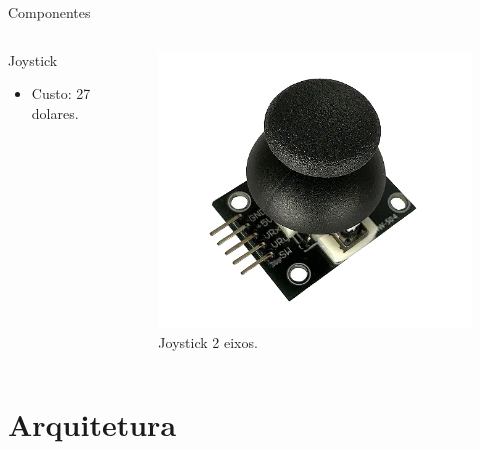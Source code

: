 \documentclass{if-beamer}
\begin{document}
\begin{frame}{Componentes}
	
	\begin{columns}
		
		\begin{column}{0.6\textwidth}
			
			\begin{block}{Joystick}
				
				\begin{itemize}
					\item Custo: 27 dolares.
				\end{itemize}
				
			\end{block}
			
		\end{column}
		
		\begin{column}{0.4\textwidth}
			
			\begin{figure}[H]
				\centering
				\includegraphics[width=0.9\linewidth]{img/joystick}
				\caption{Joystick 2 eixos.}
				\label{fig:joystick}
			\end{figure}
			
		\end{column}
		
	\end{columns}
	
	
\end{frame}


\section{Arquitetura}
\end{document}
